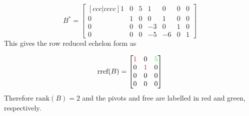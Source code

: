 \begin{equation}
    B^{\ast} =
    \begin{bmatrix}[ccc|cccc]
        1           &           0       &       5       &       1   &   0   &   0   &   0   \\       
        0           &           1       &       0       &       0   &   1   &   0   &   0   \\        
        0           &           0       &       0       &       -3  &   0   &   1   &   0   \\        
        0           &           0       &       0       &       -5  &   -6  &   0   &   1        
    \end{bmatrix}
\end{equation}
This gives the row reduced echelon form as
\begin{mdframed}[style=MyFrame]
    \begin{equation}
        \text{rref}(B) = 
        \begin{bmatrix}
            {\color{red}1}              &           0           &       {\color{green}5}     \\
             0                          &     {\color{red}1}    &       0      \\
             0                          &           0           &       0      \\
             0                          &           0           &       0      
        \end{bmatrix}
    \end{equation}
Therefore $\text{rank}(B)=2$ and the pivots and free are labelled in red and green, respectively.
\end{mdframed}




